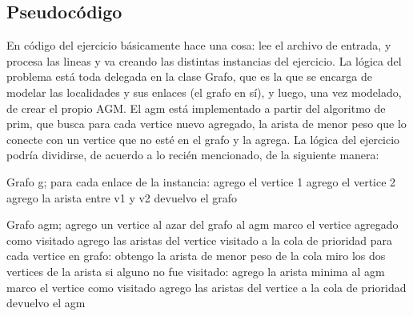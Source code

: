 \subsection{Pseudoc\'odigo}
En código del ejercicio básicamente hace una cosa: lee el archivo de entrada, y procesa las lineas y va creando las distintas instancias del ejercicio. La lógica del problema está toda delegada en la clase Grafo, que es la que se encarga de modelar las localidades y sus enlaces (el grafo en sí), y luego, una vez modelado, de crear el propio AGM. El agm está implementado a partir del algoritmo de prim, que busca para cada vertice nuevo agregado, la arista de menor peso que lo conecte con un vertice que no esté en el grafo y la agrega.
La lógica del ejercicio podría dividirse, de acuerdo a lo recién mencionado, de la siguiente manera:

\begin{codebox}
\li	Grafo g;
\li	para cada enlace de la instancia: \Do
\li		agrego el vertice 1
\li		agrego el vertice 2
\li		agrego la arista entre v1 y v2
\End
\li	devuelvo el grafo 
\end{codebox}

\begin{codebox}
\li	Grafo agm;
\li	agrego un vertice al azar del grafo al agm
\li	marco el vertice agregado como visitado
\li	agrego las aristas del vertice visitado a la cola de prioridad
\li	para cada vertice en grafo: \Do
\li		obtengo la arista de menor peso de la cola
\li		miro los dos vertices de la arista
\li		si alguno no fue visitado:\Do
\li			agrego la arista minima al agm
\li			marco el vertice como visitado
\li			agrego las aristas del vertice a la cola de prioridad
\End
\End			
\li	devuelvo el agm
\end{codebox}

